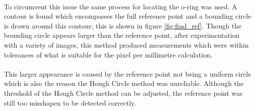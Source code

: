 		\\
		To circumvent this issue the same process for locating the o-ring was used. A contour is found which encompasses the full reference point and a bounding circle is drawn around this contour; this is shown in figure \ref{fig:find_ref}. Though the bounding circle appears larger than the reference point, after experimentation with a variety of images, this method produced measurements which were within tolerances of what is suitable for the pixel per millimetre calculation. 
		\\\\
		This larger appearance is caused by the reference point not being a uniform circle which is also the reason the Hough Circle method was unreliable. Although the threshold of the Hough Circle method can be adjusted, the reference point was still too misshapen to be detected correctly.
